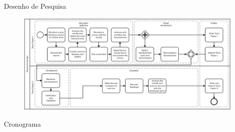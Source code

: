 \begin{frame}{{\sffamily Desenho de Pesquisa}}
    \begin{figure}
    	\centering
    	\includegraphics[width=1\textwidth, ]{imagens/2-research-diagram.png}
    \end{figure}
\end{frame}

\begin{frame}{{\sffamily Cronograma}}

\end{frame}


